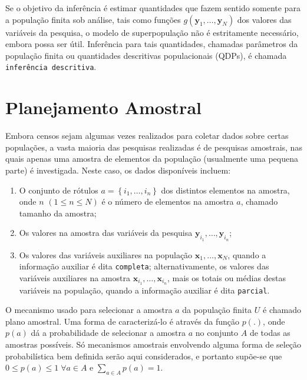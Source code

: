 \documentclass[]{book}
\theoremstyle{definition}
\theoremstyle{definition}
\theoremstyle{definition}
\theoremstyle{remark}
\begin{document}
Se o objetivo da inferência é estimar quantidades que fazem sentido
somente para a população finita sob análise, tais como funções
\(g\left( \mathbf{y}_1 ,\ldots, \mathbf{y}_N \right)\) dos valores das
variáveis da pesquisa, o modelo de superpopulação não é estritamente
necessário, embora possa ser útil. Inferência para tais quantidades,
chamadas parâmetros da população finita ou quantidades descritivas
populacionais (QDPs), é chamada \texttt{inferência\ descritiva}.

\section{Planejamento Amostral}\label{planamo}

Embora censos sejam algumas vezes realizados para coletar dados sobre
certas populações, a vasta maioria das pesquisas realizadas é de
pesquisas amostrais, nas quais apenas uma amostra de elementos da
população (usualmente uma pequena parte) é investigada. Neste caso, os
dados disponíveis incluem:

\begin{enumerate}
\def\labelenumi{\arabic{enumi}.}
\item
  O conjunto de rótulos \(a=\left\{ i_1 , \ldots, i_n \right\}\) dos
  distintos elementos na amostra, onde \(n\)
  \(\left( 1 \leq n \leq N \right)\) é o número de elementos na amostra
  \(a\), chamado tamanho da amostra;
\item
  Os valores na amostra das variáveis da pesquisa
  \(\mathbf{y}_{i_1} ,\ldots, \mathbf{y}_{i_n}\);
\item
  Os valores das variáveis auxiliares na população
  \(\mathbf{x}_1 ,\ldots, \mathbf{x}_N\), quando a informação auxiliar é
  dita \texttt{completa}; alternativamente, os valores das variáveis
  auxiliares na amostra \(\mathbf{x}_{i_1} ,\ldots, \mathbf{x}_{i_n}\),
  mais os totais ou médias destas variáveis na população, quando a
  informação auxiliar é dita \texttt{parcial}.
\end{enumerate}

O mecanismo usado para selecionar a amostra \(a\) da população finita
\(U\) é chamado plano amostral. Uma forma de caracterizá-lo é através da
função \(p\left( .\right)\), onde \(p(a)\) dá a probabilidade de
selecionar a amostra \(a\) no conjunto \(A\) de todas as amostras
possíveis. Só mecanismos amostrais envolvendo alguma forma de seleção
probabilística bem definida serão aqui considerados, e portanto supõe-se
que \(0 \leq p(a) \leq 1 \; \forall a \in A\) e
\(\sum_{a \in A} p(a)=1\).
\end{document}
